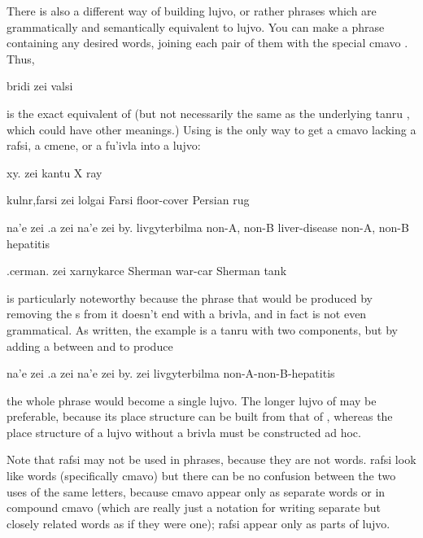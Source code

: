 There is also a different way of building lujvo, or rather phrases which are grammatically and semantically equivalent to lujvo. You can make a phrase containing any desired words, joining each pair of them with the special cmavo . Thus,
\begin{example}
bridi zei valsi
\end{example}

{\noindent}is the exact equivalent of  (but not necessarily the same as the underlying tanru , which could have other meanings.) Using  is the only way to get a cmavo lacking a rafsi, a cmene, or a fu'ivla into a lujvo:
\begin{example}
xy. zei kantu\n
X ray
\end{example}

\begin{example}
kulnr,farsi zei lolgai\n
Farsi floor-cover\n
Persian rug
\end{example}

\begin{example}
na'e zei .a zei na'e zei by. livgyterbilma\n
non-A, non-B liver-disease\n
non-A, non-B hepatitis
\end{example}

\begin{example}
.cerman. zei xarnykarce\n
Sherman war-car\n
Sherman tank
\end{example}

 is particularly noteworthy because the phrase that would be produced by removing the s from it doesn't end with a brivla, and in fact is not even grammatical. As written, the example is a tanru with two components, but by adding a  between  and  to produce
\begin{example}
na'e zei .a zei na'e zei by. zei livgyterbilma\n
non-A-non-B-hepatitis
\end{example}

{\noindent}the whole phrase would become a single lujvo. The longer lujvo of  may be preferable, because its place structure can be built from that of , whereas the place structure of a lujvo without a brivla must be constructed ad hoc. 

Note that rafsi may not be used in  phrases, because they are not words.  rafsi look like words (specifically cmavo) but there can be no confusion between the two uses of the same letters, because cmavo appear only as separate words or in compound cmavo (which are really just a notation for writing separate but closely related words as if they were one); rafsi appear only as parts of lujvo.



